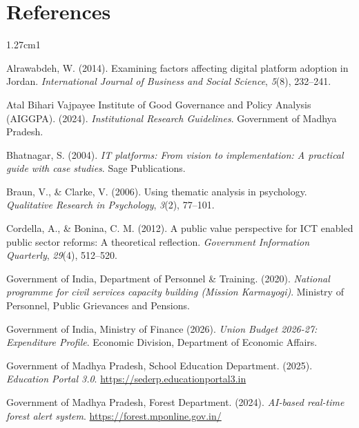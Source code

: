 \documentclass[11pt,a4paper]{article}
\begin{document}
\section{References}

\vspace{0.2cm}
\small\setlength{\parindent}{0pt}\singlespacing
\begin{hangparas}{1.27cm}{1}

Alrawabdeh, W. (2014). Examining factors affecting digital platform adoption in Jordan.
\textit{International Journal of Business and Social Science}, \textit{5}(8), 232--241.

\vspace{4pt}
Atal Bihari Vajpayee Institute of Good Governance and Policy Analysis (AIGGPA). (2024). \textit{Institutional Research Guidelines}. Government of Madhya Pradesh.

\vspace{4pt}
Bhatnagar, S. (2004). \textit{IT platforms: From vision to implementation: A
practical guide with case studies}. Sage Publications.

\vspace{4pt}
Braun, V., \& Clarke, V. (2006). Using thematic analysis in psychology.
\textit{Qualitative Research in Psychology}, \textit{3}(2), 77--101.

\vspace{4pt}
Cordella, A., \& Bonina, C. M. (2012). A public value perspective for ICT enabled public sector reforms: A theoretical reflection. \textit{Government Information Quarterly}, \textit{29}(4), 512--520.

\vspace{4pt}
Government of India, Department of Personnel \& Training. (2020).
\textit{National programme for civil services capacity building (Mission Karmayogi)}.
Ministry of Personnel, Public Grievances and Pensions.

\vspace{4pt}
Government of India, Ministry of Finance (2026). \textit{Union Budget 2026-27: Expenditure Profile}.
Economic Division, Department of Economic Affairs.

\vspace{4pt}
Government of Madhya Pradesh, School Education Department. (2025).
\textit{Education Portal 3.0}. \url{https://sederp.educationportal3.in}

\vspace{4pt}
Government of Madhya Pradesh, Forest Department. (2024).
\textit{AI-based real-time forest alert system}.
\url{https://forest.mponline.gov.in/}


\end{hangparas}
\end{document}
